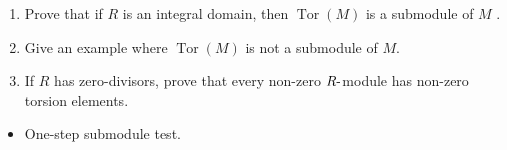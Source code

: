 \begin{enumerate}
\def\labelenumi{\alph{enumi}.}
\item
  Prove that if \(R\) is an integral domain, then
  \(\operatorname{Tor}(M )\) is a submodule of \(M\) .
\item
  Give an example where \(\operatorname{Tor}(M )\) is not a submodule of
  \(M\).
\item
  If \(R\) has zero-divisors, prove that every non-zero
  \(R{\hbox{-}}\)module has non-zero torsion elements.
\end{enumerate}

\begin{concept}

\envlist

\begin{itemize}
\tightlist
\item
  One-step submodule test.
\end{itemize}

\end{concept}

